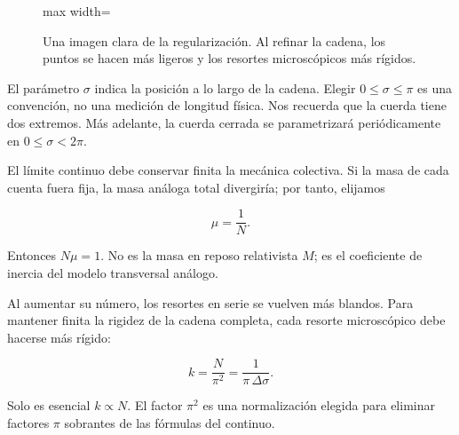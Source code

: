 \begin{figure}[H]
  \centering
  \begin{adjustbox}{max width=\linewidth}
  \end{adjustbox}
  \caption{Una imagen clara de la regularización. Al refinar la cadena, los puntos se hacen más ligeros y los resortes microscópicos más rígidos.}
  \label{fig:l02-chain-redraw}
\end{figure}

El parámetro \(\sigma\) indica la posición a lo largo de la cadena. Elegir \(0\leq\sigma\leq\pi\) es una convención, no una medición de longitud física. Nos recuerda que la cuerda tiene dos extremos. Más adelante, la cuerda cerrada se parametrizará periódicamente en \(0\leq\sigma<2\pi\).

El límite continuo debe conservar finita la mecánica colectiva. Si la masa de cada cuenta fuera fija, la masa análoga total divergiría; por tanto, elijamos

\begin{equation}
  \mu=\frac{1}{N}.
  \label{eq:l02-mu-scaling}
\end{equation}

Entonces \(N\mu=1\). No es la masa en reposo relativista \(M\); es el coeficiente de inercia del modelo transversal análogo.

Al aumentar su número, los resortes en serie se vuelven más blandos. Para mantener finita la rigidez de la cadena completa, cada resorte microscópico debe hacerse más rígido:

\begin{equation}
  k=\frac{N}{\pi^2}
  =\frac{1}{\pi\,\Delta\sigma}.
  \label{eq:l02-k-scaling}
\end{equation}

Solo es esencial \(k\propto N\). El factor \(\pi^2\) es una normalización elegida para eliminar factores \(\pi\) sobrantes de las fórmulas del continuo.

